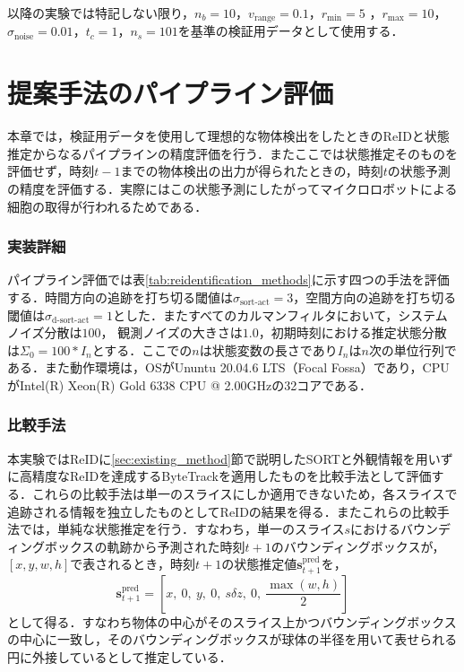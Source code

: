 以降の実験では特記しない限り，$n_b = 10$，$v_{\text{range}} = 0.1$，$r_{\text{min}} = 5$ ，$r_{\text{max}} = 10$，$\sigma_{\text{noise}} = 0.01$，$t_c = 1$，$n_s = 101$を基準の検証用データとして使用する．

\section{提案手法のパイプライン評価}
\label{sec:pipeline_evaluation}

本章では，検証用データを使用して理想的な物体検出をしたときのReIDと状態推定からなるパイプラインの精度評価を行う．またここでは状態推定そのものを評価せず，時刻$t-1$までの物体検出の出力が得られたときの，時刻$t$の状態予測の精度を評価する．実際にはこの状態予測にしたがってマイクロロボットによる細胞の取得が行われるためである．

\subsubsection{実装詳細}
パイプライン評価では表\ref{tab:reidentification_methods}に示す四つの手法を評価する．時間方向の追跡を打ち切る閾値は$\sigma_{\text{sort-act}} = 3$，空間方向の追跡を打ち切る閾値は$\sigma_{\text{d-sort-act}} = 1$とした．またすべてのカルマンフィルタにおいて，システムノイズ分散は$100$，
観測ノイズの大きさは$1.0$，初期時刻における推定状態分散は$\Sigma_0 = 100 * I_n$とする．ここでの$n$は状態変数の長さであり$I_n$は$n$次の単位行列である．また動作環境は，OSがUnuntu 20.04.6 LTS（Focal Fossa）であり，CPUがIntel(R) Xeon(R) Gold 6338 CPU @ 2.00GHzの32コアである．

\subsubsection{比較手法}
本実験ではReIDに\ref{sec:existing_method}節で説明したSORTと外観情報を用いずに高精度なReIDを達成するByteTrack\cite{zhang2022bytetrack}を適用したものを比較手法として評価する．これらの比較手法は単一のスライスにしか適用できないため，各スライスで追跡される情報を独立したものとしてReIDの結果を得る．またこれらの比較手法では，単純な状態推定を行う．すなわち，単一のスライス$s$におけるバウンディングボックスの軌跡から予測された時刻$t + 1$のバウンディングボックスが，$[x, y, w, h]$で表されるとき，時刻$t+1$の状態推定値$\bm{s}_{t+1}^{\text{pred}}$を，
\begin{equation}
    \label{eq:naive_state_estimation}
    \bm{s}^{\text{pred}}_{t+1} = \left[x,~ 0,~ y,~ 0,~ s \delta z,~ 0,~ \frac{\max(w, h)}{2}\right]
\end{equation}
として得る．すなわち物体の中心がそのスライス上かつバウンディングボックスの中心に一致し，そのバウンディングボックスが球体の半径を用いて表せられる円に外接しているとして推定している．

